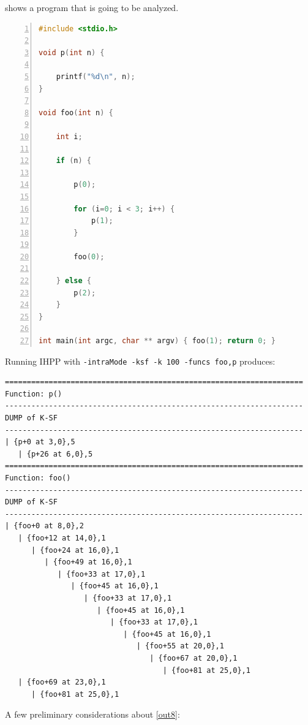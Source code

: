 \documentclass[a4paper,11pt]{report}
\begin{document}
 shows a program that is going to be analyzed.

\begin{lstlisting}[language=C, 
	caption={prog4.c, another simple program}, label=prog4, frame=leftline, numbers=left]
#include <stdio.h>

void p(int n) { 
	
	printf("%d\n", n); 
}

void foo(int n) {

	int i;

	if (n) {

		p(0);

		for (i=0; i < 3; i++) {
			p(1);
		}

		foo(0);

	} else {
		p(2);
	}
}

int main(int argc, char ** argv) { foo(1); return 0; }
\end{lstlisting}

\noindent
Running IHPP with \verb|-intraMode -ksf -k 100 -funcs foo,p| produces:

\begin{lstlisting}[label=out8, caption={IHPP partial output for \texttt{prog4}},frame=bottomline]
====================================================================
Function: p()
--------------------------------------------------------------------
DUMP of K-SF
--------------------------------------------------------------------
| {p+0 at 3,0},5
   | {p+26 at 6,0},5
====================================================================
Function: foo()
--------------------------------------------------------------------
DUMP of K-SF
--------------------------------------------------------------------
| {foo+0 at 8,0},2
   | {foo+12 at 14,0},1
      | {foo+24 at 16,0},1
         | {foo+49 at 16,0},1
            | {foo+33 at 17,0},1
               | {foo+45 at 16,0},1
                  | {foo+33 at 17,0},1
                     | {foo+45 at 16,0},1
                        | {foo+33 at 17,0},1
                           | {foo+45 at 16,0},1
                              | {foo+55 at 20,0},1
                                 | {foo+67 at 20,0},1
                                    | {foo+81 at 25,0},1
   | {foo+69 at 23,0},1
      | {foo+81 at 25,0},1

\end{lstlisting}

\noindent
A few preliminary considerations about \cref{out8}:
\renewcommand{\labelitemi}{$-$}
\end{document}
